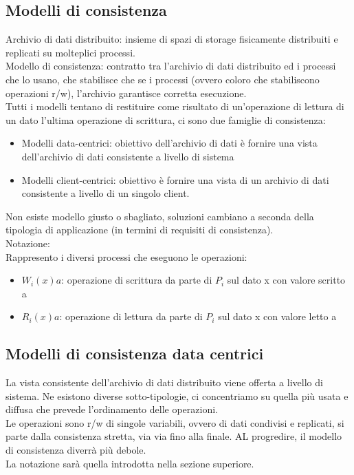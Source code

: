 \documentclass{article}
\begin{document}
\subsection{Modelli di consistenza}
Archivio di dati distribuito: insieme di spazi di storage fisicamente distribuiti e replicati su molteplici processi.\\ Modello di consistenza: contratto tra l'archivio di dati distribuito ed i processi che lo usano, che stabilisce che se i processi (ovvero coloro che stabiliscono operazioni r/w), l'archivio garantisce corretta esecuzione.\\ Tutti i modelli tentano di restituire come risultato di un'operazione di lettura di un dato l'ultima operazione di scrittura,  ci sono due famiglie di consistenza:
\begin{itemize}
\item Modelli data-centrici: obiettivo dell'archivio di dati è fornire una vista dell'archivio di dati consistente a livello di sistema
\item Modelli client-centrici: obiettivo è fornire una vista di un archivio di dati consistente a livello di un singolo client.
\end{itemize}
Non esiste modello giusto o sbagliato, soluzioni cambiano a seconda della tipologia di applicazione (in termini di requisiti di consistenza).\\ Notazione:\\
Rappresento i diversi processi che eseguono le operazioni:
\begin{itemize}
\item $W_i(x)a$: operazione di scrittura da parte di $P_i$ sul dato x con valore scritto a
\item $R_i(x)a$: operazione di lettura da parte di $P_i$ sul dato x con valore letto a
\end{itemize}
\subsection{Modelli di consistenza data centrici}
La vista consistente dell'archivio di dati distribuito viene offerta a livello di sistema. Ne esistono diverse sotto-tipologie, ci concentriamo su quella più usata e diffusa che prevede l'ordinamento delle operazioni.\\ Le operazioni sono r/w di singole variabili, ovvero di dati condivisi e replicati, si parte dalla consistenza stretta, via via fino alla finale. AL progredire, il modello di consistenza diverrà più debole.\\ La notazione sarà quella introdotta nella sezione superiore. 
\end{document}
